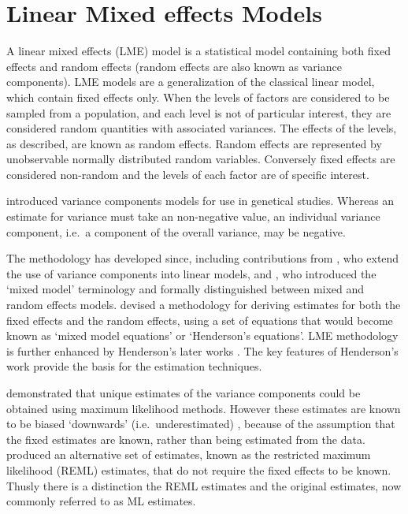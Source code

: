 \documentclass[12pt, a4paper]{report}
\theoremstyle{plain}
\theoremstyle{definition}
\theoremstyle{remark}
\begin{document}
	\section{Linear Mixed effects Models}
	A linear mixed effects (LME) model is a statistical model containing both fixed effects and random effects (random effects are also known as variance components). LME models are a generalization of the classical linear model, which contain fixed effects only. When the levels of factors are considered to be sampled from a population,
	and each level is not of particular interest, they are considered random quantities with associated variances.
	The effects of the levels, as described, are known as random effects. Random effects are represented by unobservable
	normally distributed random variables. Conversely fixed effects are considered non-random and the
	levels of each factor are of specific interest.
	
	\citet{Fisher4} introduced variance components models for use in genetical studies. Whereas an estimate for variance must take an non-negative value, an individual variance component, i.e.\ a component of the overall variance, may be negative.
	
	The methodology has developed since, including contributions from
	\citet{tippett}, who extend the use of variance components into linear models, and \citet{eisenhart}, who introduced the `mixed model' terminology and formally distinguished between mixed and random effects models. \citet{Henderson:1950} devised a methodology for deriving estimates for both the fixed effects and the random effects, using a set of equations that would become known as `mixed model equations' or `Henderson's equations'.
	LME methodology is further enhanced by Henderson's later works \citep{Henderson53, Henderson59,Henderson63,Henderson73,Henderson84a}. The key features of Henderson's work provide the basis for the estimation techniques.
	
	\citet{HartleyRao} demonstrated that unique estimates of the variance components could be obtained using maximum likelihood methods. However these estimates are known to be biased `downwards' (i.e.\ underestimated) , because of the assumption that the fixed estimates are known, rather than being estimated from the data. \citet{PattersonThompson} produced an alternative set of estimates, known as the restricted maximum likelihood (REML) estimates, that do not require the fixed effects to be known. Thusly there is a distinction the REML estimates and the original estimates, now commonly referred to as ML estimates.
	
\end{document}
